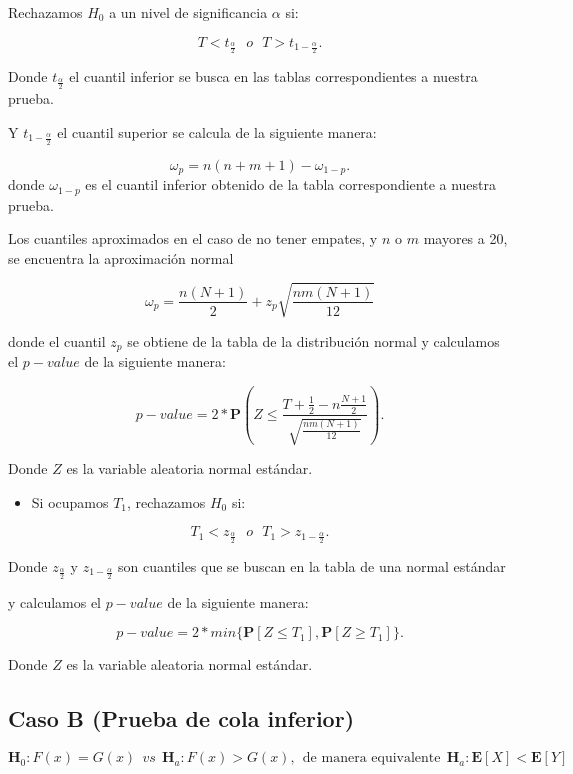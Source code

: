 \documentclass[
  a4paper,
  oneside,
  openany]{book}
\providecommand{\tightlist}{%
  \setlength{\itemsep}{0pt}\setlength{\parskip}{0pt}}
\begin{document}
Rechazamos \(H_0\) a un nivel de significancia \(\alpha\) si:

\[T < t_{\frac{\alpha}{2}} \ \ \   o \ \ \ T > t_{1-\frac{\alpha}{2}}.\]

Donde \(t_\frac{\alpha}{2}\) el cuantil inferior se busca en las tablas correspondientes a nuestra prueba.

Y \(t_{1-\frac{\alpha}{2}}\) el cuantil superior se calcula de la siguiente manera:

\[\omega_p= n(n+m+1)-\omega_{1-p}.\]
donde \(\omega_{1-p}\) es el cuantil inferior obtenido de la tabla correspondiente a nuestra prueba.

Los cuantiles aproximados en el caso de no tener empates, y \(n\) o \(m\) mayores a 20, se encuentra la aproximación normal

\[\omega_p= \frac{n(N+1)}{2} + z_p\sqrt{\frac{n m(N+1)}{12}}\]

donde el cuantil \(z_p\) se obtiene de la tabla de la distribución normal y calculamos el \(p-value\) de la siguiente manera:

\[p-value = 2*\mathbf{P}\left(Z\leq\frac{T+\frac{1}{2}-n\frac{N+1}{2}}{\sqrt{\frac{nm(N+1)}{12}}}\right).\]

Donde \(Z\) es la variable aleatoria normal estándar.

\begin{itemize}
\tightlist
\item
  Si ocupamos \(T_{1}\), rechazamos \(H_0\) si:
\end{itemize}

\[T_{1} < z_{\frac{\alpha}{2}} \ \ \  o \ \ \  T_{1} > z_{1-\frac{\alpha}{2}}.\]

Donde \(z_\frac{\alpha}{2}\) y \(z_{1-\frac{\alpha}{2}}\) son cuantiles que se buscan en la tabla de una normal estándar

y calculamos el \(p-value\) de la siguiente manera:

\[p-value=2*min\{\mathbf{P}[Z\leq T_{1}],\mathbf{P}[Z\geq T_{1}]\}.\]

Donde \(Z\) es la variable aleatoria normal estándar.

\hypertarget{caso-b-prueba-de-cola-inferior-4}{%
\subsection*{Caso B (Prueba de cola inferior)}\label{caso-b-prueba-de-cola-inferior-4}}


\[\textbf{H}_0: F(x) = G(x) \ \ vs \ \ \textbf{H}_a: F(x) > G(x),  \ \ \mbox{de manera equivalente} \ \ \textbf{H}_a:\mathbf{E}[X]  < \mathbf{E}[Y]\]
\end{document}
